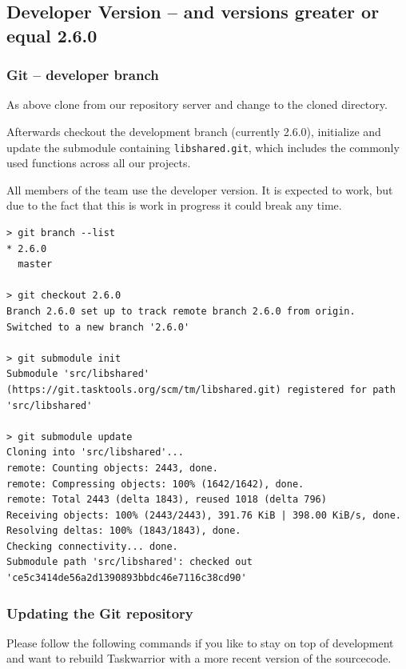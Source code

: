 \documentclass[DIV=12,fontsize=12pt,parskip=half,paper=portrait,%
               headheight=61pt,headinclude=yes,%
               footheight=15pt,footinclude=no]{scrartcl}
\begin{document}
\subsection{Developer Version -- and versions greater or equal 2.6.0}

\subsubsection{Git -- developer branch}

As above clone from our repository server and change to the cloned directory.

Afterwards checkout the development branch (currently 2.6.0), initialize and update the submodule containing \texttt{libshared.git}, which includes the commonly used functions across all our projects.

All members of the team use the developer version. It is expected to work, but due to the fact that this is work in progress it could break any time.

\begin{lstlisting}
> git branch --list
* 2.6.0
  master

> git checkout 2.6.0
Branch 2.6.0 set up to track remote branch 2.6.0 from origin.
Switched to a new branch '2.6.0'

> git submodule init
Submodule 'src/libshared' (https://git.tasktools.org/scm/tm/libshared.git) registered for path 'src/libshared'

> git submodule update
Cloning into 'src/libshared'...
remote: Counting objects: 2443, done.
remote: Compressing objects: 100% (1642/1642), done.
remote: Total 2443 (delta 1843), reused 1018 (delta 796)
Receiving objects: 100% (2443/2443), 391.76 KiB | 398.00 KiB/s, done.
Resolving deltas: 100% (1843/1843), done.
Checking connectivity... done.
Submodule path 'src/libshared': checked out 'ce5c3414de56a2d1390893bbdc46e7116c38cd90'\end{lstlisting}

\newpage

\subsubsection{Updating the Git repository}

Please follow the following commands if you like to stay on top of development and want to rebuild Taskwarrior with a more recent version of the sourcecode.
\end{document}
